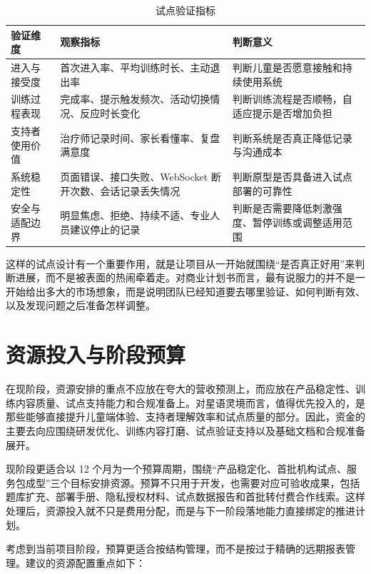 \begin{table}[H]
\centering
\caption{试点验证指标}
\small
\begin{tabularx}{0.96\textwidth}{>{\raggedright\arraybackslash}p{} >{\raggedright\arraybackslash}p{} X}
\toprule
验证维度 & 观察指标 & 判断意义 \\
\midrule
进入与接受度 & 首次进入率、平均训练时长、主动退出率 & 判断儿童是否愿意接触和持续使用系统 \\
训练过程表现 & 完成率、提示触发频次、活动切换情况、反应时长变化 & 判断训练流程是否顺畅，自适应提示是否增加负担 \\
支持者使用价值 & 治疗师记录时间、家长看懂率、复盘满意度 & 判断系统是否真正降低记录与沟通成本 \\
系统稳定性 & 页面错误、接口失败、WebSocket 断开次数、会话记录丢失情况 & 判断原型是否具备进入试点部署的可靠性 \\
安全与适配边界 & 明显焦虑、拒绝、持续不适、专业人员建议停止的记录 & 判断是否需要降低刺激强度、暂停训练或调整适用范围 \\
\bottomrule
\end{tabularx}
\end{table}

这样的试点设计有一个重要作用，就是让项目从一开始就围绕“是否真正好用”来判断进展，而不是被表面的热闹牵着走。对商业计划书而言，最有说服力的并不是一开始给出多大的市场想象，而是说明团队已经知道要去哪里验证、如何判断有效、以及发现问题之后准备怎样调整。

\section{资源投入与阶段预算}
在现阶段，资源安排的重点不应放在夸大的营收预测上，而应放在产品稳定性、训练内容质量、试点支持能力和合规准备上。对星语灵境而言，值得优先投入的，是那些能够直接提升儿童端体验、支持者理解效率和试点质量的部分。因此，资金的主要去向应围绕研发优化、训练内容打磨、试点验证支持以及基础文档和合规准备展开。

现阶段更适合以 12 个月为一个预算周期，围绕“产品稳定化、首批机构试点、服务包成型”三个目标安排资源。预算不只用于开发，也需要对应可验收成果，包括题库扩充、部署手册、隐私授权材料、试点数据报告和首批转付费合作线索。这样处理后，资源投入就不只是费用分配，而是与下一阶段落地能力直接绑定的推进计划。

考虑到当前项目阶段，预算更适合按结构管理，而不是按过于精确的远期报表管理。建议的资源配置重点如下：

